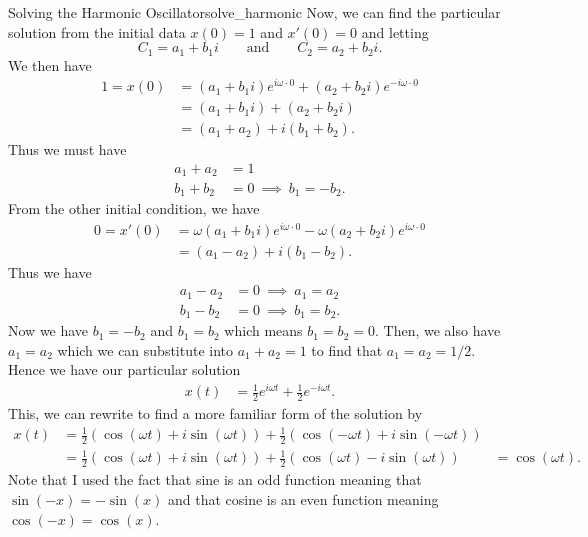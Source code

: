 \begin{ex}{Solving the Harmonic Oscillator}{solve_harmonic}
        Now, we can find the particular solution from the initial data $x(0)=1$ and $x'(0)=0$ and letting
        \[
        C_1=a_1+b_1i \qquad \textrm{and} \qquad C_2=a_2+b_2i.
        \]
        We then have
        \begin{align*}
                    1=x(0)&=(a_1+b_1i)e^{i\omega \cdot 0}+(a_2+b_2 i)e^{-i\omega \cdot 0}\\
                    &=(a_1+b_1i)+(a_2+b_2i)\\
                    &=(a_1+a_2)+i(b_1+b_2).
        \end{align*}
        Thus we must have
        \begin{align*}
            a_1+a_2&=1\\
            b_1+b_2&=0 ~\implies~ b_1=-b_2.
        \end{align*}
        From the other initial condition, we have
        \begin{align*}
        0=x'(0)&=\omega(a_1+b_1i)e^{i\omega \cdot 0}-\omega (a_2+b_2i)e^{i\omega \cdot 0}\\
        &=(a_1-a_2)+i(b_1-b_2).
        \end{align*}
        Thus we have
        \begin{align*}
            a_1-a_2&=0 ~\implies~ a_1=a_2\\
            b_1-b_2&=0 ~\implies~ b_1=b_2.
        \end{align*}
        Now we have $b_1=-b_2$ and $b_1=b_2$ which means $b_1=b_2=0$.  Then, we also have $a_1=a_2$ which we can substitute into $a_1+a_2=1$ to find that $a_1=a_2=1/2$.  Hence we have our particular solution
        \begin{align*}
            x(t)&=\frac{1}{2}e^{i\omega t}+\frac{1}{2}e^{-i\omega t}.
            \end{align*}
            This, we can rewrite to find a more familiar form of the solution by
            \begin{align*}
            x(t)&= \frac{1}{2}(\cos(\omega t)+i\sin(\omega t)) + \frac{1}{2}(\cos(-\omega t)+i\sin(-\omega t))\\
            &= \frac{1}{2}(\cos(\omega t)+i\sin(\omega t))+\frac{1}{2}(\cos(\omega t)-i\sin(\omega t))
            &=\cos(\omega t).
        \end{align*}
        Note that I used the fact that sine is an odd function meaning that $\sin(-x)=-\sin(x)$ and that cosine is an even function meaning $\cos(-x)=\cos(x)$.
        \end{ex}

